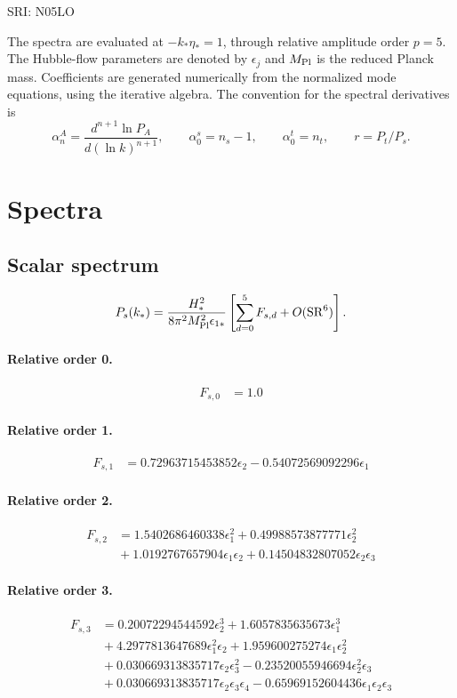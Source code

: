 \documentclass[10pt]{article}
\begin{document}
\begin{center}\Large SRI: N05LO\end{center}
The spectra are evaluated at $-k_*\eta_*=1$, through relative amplitude
order $p=5$. The Hubble-flow parameters are denoted by $\epsilon_j$
and $M_{\rm Pl}$ is the reduced Planck mass. Coefficients are generated
numerically from the normalized mode equations, using the iterative algebra.
The convention for the spectral derivatives is
\[
\alpha_n^A=\frac{d^{n+1}\ln P_A}{d(\ln k)^{n+1}},\qquad
\alpha_0^s=n_s-1,\qquad\alpha_0^t=n_t,\qquad r=P_t/P_s.
\]
\section{Spectra}

\subsection{Scalar spectrum}
\[P_s(k_*)=\frac{H_*^2}{8\pi^2M_{\rm Pl}^2\epsilon_{1*}}\left[\sum_{d=0}^{5}F_{s,d}+O(\mathrm{SR}^{6})\right].\]
\paragraph{Relative order 0.}
\begin{align*}
F_{s,0} &= 1.0
\end{align*}

\paragraph{Relative order 1.}
\begin{align*}
F_{s,1} &= 0.72963715453852 \epsilon_{2} - 0.54072569092296 \epsilon_{1}
\end{align*}

\paragraph{Relative order 2.}
\begin{align*}
F_{s,2} &= 1.5402686460338 \epsilon_{1}^{2} + 0.49988573877771 \epsilon_{2}^{2} \\
&{}  + 1.0192767657904 \epsilon_{1} \epsilon_{2} + 0.14504832807052 \epsilon_{2} \epsilon_{3}
\end{align*}

\paragraph{Relative order 3.}
\begin{align*}
F_{s,3} &= 0.20072294544592 \epsilon_{2}^{3} + 1.6057835635673 \epsilon_{1}^{3} \\
&{}  + 4.2977813647689 \epsilon_{1}^{2} \epsilon_{2} + 1.959600275274 \epsilon_{1} \epsilon_{2}^{2} \\
&{}  + 0.030669313835717 \epsilon_{2} \epsilon_{3}^{2} - 0.23520055946694 \epsilon_{2}^{2} \epsilon_{3} \\
&{}  + 0.030669313835717 \epsilon_{2} \epsilon_{3} \epsilon_{4} - 0.65969152604436 \epsilon_{1} \epsilon_{2} \epsilon_{3}
\end{align*}
\end{document}
